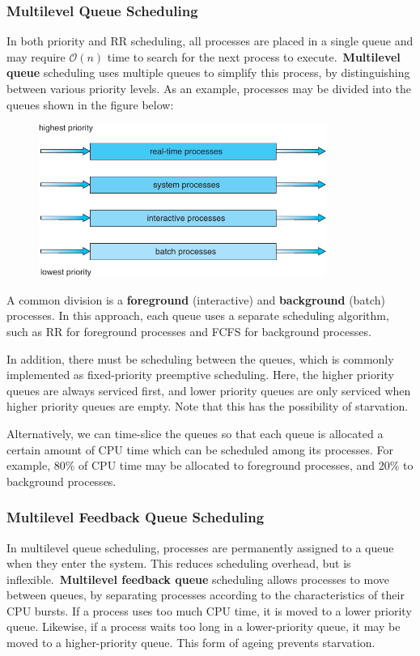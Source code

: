 \documentclass{article}
\begin{document}
\subsubsection{Multilevel Queue Scheduling}
In both priority and RR scheduling, all processes are placed in a
single queue and may require \(\mathcal{O}\left( n \right)\) time to
search for the next process to execute.\ \textbf{Multilevel queue}
scheduling uses multiple queues to simplify this process, by
distinguishing between various priority levels. As an example,
processes may be divided into the queues shown in the figure below:
\begin{figure}[H]
    \centering
    \includegraphics[height = 5cm]{figures/multilevel_queue_scheduling.pdf}
\end{figure}
A common division is a \textbf{foreground} (interactive) and
\textbf{background} (batch) processes.
In this approach, each queue uses a separate scheduling algorithm, such
as RR for foreground processes and FCFS for background processes.

In addition, there must be scheduling between the queues, which is
commonly implemented as fixed-priority preemptive scheduling. Here, the
higher priority queues are always serviced first, and lower priority
queues are only serviced when higher priority queues are empty. Note
that this has the possibility of starvation.

Alternatively, we can time-slice the queues so that each queue is
allocated a certain amount of CPU time which can be scheduled among its
processes. For example, 80\% of CPU time may be allocated to foreground
processes, and 20\% to background processes.
\subsubsection{Multilevel Feedback Queue Scheduling}
In multilevel queue scheduling, processes are permanently assigned to a
queue when they enter the system. This reduces scheduling overhead, but
is inflexible.\ \textbf{Multilevel feedback queue} scheduling allows
processes to move between queues, by separating processes according to
the characteristics of their CPU bursts. If a process uses too much CPU
time, it is moved to a lower priority queue. Likewise, if a process
waits too long in a lower-priority queue, it may be moved to a
higher-priority queue. This form of ageing prevents starvation.
\end{document}
